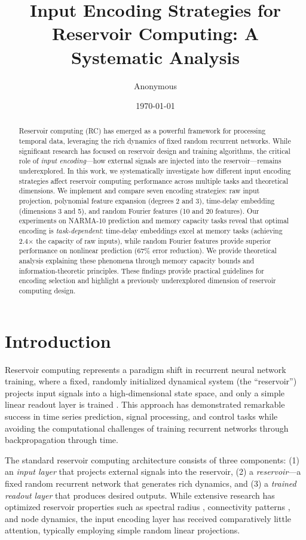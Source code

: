 \documentclass[11pt]{article}
\title{Input Encoding Strategies for Reservoir Computing: A Systematic Analysis}
\author{Anonymous}
\date{\today}
\begin{document}
\mailtitle

\begin{abstract}
Reservoir computing (RC) has emerged as a powerful framework for processing temporal data, leveraging the rich dynamics of fixed random recurrent networks. While significant research has focused on reservoir design and training algorithms, the critical role of \emph{input encoding}---how external signals are injected into the reservoir---remains underexplored. In this work, we systematically investigate how different input encoding strategies affect reservoir computing performance across multiple tasks and theoretical dimensions. We implement and compare seven encoding strategies: raw input projection, polynomial feature expansion (degrees 2 and 3), time-delay embedding (dimensions 3 and 5), and random Fourier features (10 and 20 features). Our experiments on NARMA-10 prediction and memory capacity tasks reveal that optimal encoding is \emph{task-dependent}: time-delay embeddings excel at memory tasks (achieving 2.4$\times$ the capacity of raw inputs), while random Fourier features provide superior performance on nonlinear prediction (67\% error reduction). We provide theoretical analysis explaining these phenomena through memory capacity bounds and information-theoretic principles. These findings provide practical guidelines for encoding selection and highlight a previously underexplored dimension of reservoir computing design.
\end{abstract}

\section{Introduction}

Reservoir computing represents a paradigm shift in recurrent neural network training, where a fixed, randomly initialized dynamical system (the ``reservoir'') projects input signals into a high-dimensional state space, and only a simple linear readout layer is trained \cite{jaeger2001echo,maass2002real}. This approach has demonstrated remarkable success in time series prediction, signal processing, and control tasks while avoiding the computational challenges of training recurrent networks through backpropagation through time.

The standard reservoir computing architecture consists of three components: (1) an \emph{input layer} that projects external signals into the reservoir, (2) a \emph{reservoir}---a fixed random recurrent network that generates rich dynamics, and (3) a \emph{trained readout layer} that produces desired outputs. While extensive research has optimized reservoir properties such as spectral radius \cite{jaeger2007optimization}, connectivity patterns \cite{rodan2010minimum}, and node dynamics, the input encoding layer has received comparatively little attention, typically employing simple random linear projections.
\end{document}
